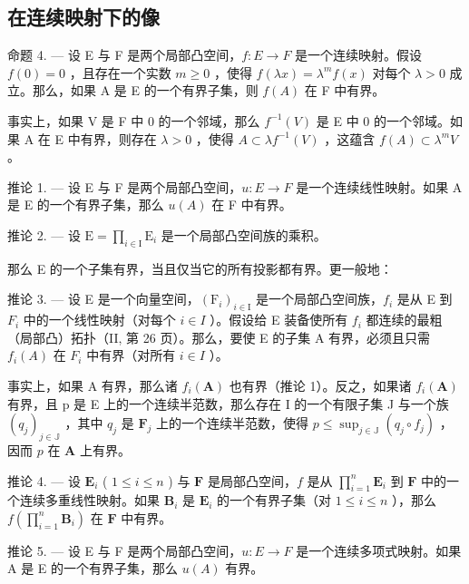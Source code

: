 \subsection{在连续映射下的像}

命题 4. --- 设 E 与 F 是两个局部凸空间，\(f:E \rightarrow F\) 是一个连续映射。假设 \(f(0) = 0\) ，且存在一个实数 \(m \geqslant 0\) ，使得 \(f(\lambda x) = \lambda^{m}f(x)\) 对每个 \(\lambda > 0\) 成立。那么，如果 A 是 E 的一个有界子集，则 \(f(A)\) 在 F 中有界。

事实上，如果 V 是 F 中 0 的一个邻域，那么 \(f^{-1}(V)\) 是 E 中 0 的一个邻域。如果 A 在 E 中有界，则存在 \(\lambda > 0\) ，使得 \(A \subset \lambda f^{-1}(V)\) ，这蕴含 \(f(A) \subset \lambda^{m}V\) 。

推论 1. --- 设 E 与 F 是两个局部凸空间，\(u:E\to F\) 是一个连续线性映射。如果 A 是 E 的一个有界子集，那么 \(u(A)\) 在 F 中有界。

推论 2. --- 设 \(\mathrm{E} = \prod_{i\in \mathrm{I}}\mathrm{E}_i\) 是一个局部凸空间族的乘积。

那么 E 的一个子集有界，当且仅当它的所有投影都有界。更一般地：

推论 3. --- 设 E 是一个向量空间，\((\mathrm{F}_{i})_{i\in\mathrm{I}}\) 是一个局部凸空间族，\(f_{i}\) 是从 E 到 \(F_{i}\) 中的一个线性映射（对每个 \(i\in I\) ）。假设给 E 装备使所有 \(f_{i}\) 都连续的最粗（局部凸）拓扑（II, 第 26 页）。那么，要使 E 的子集 A 有界，必须且只需 \(f_{i}(A)\) 在 \(F_{i}\) 中有界（对所有 \(i\in I\) ）。

事实上，如果 A 有界，那么诸 \(f_{i}(\mathbf{A})\) 也有界（推论 1）。反之，如果诸 \(f_{i}(\mathbf{A})\) 有界，且 p 是 E 上的一个连续半范数，那么存在 I 的一个有限子集 J 与一个族 \((q_{j})_{j\in \mathbb{J}}\) ，其中 \(q_{j}\) 是 \(\mathbf{F}_j\) 上的一个连续半范数，使得 \(p\leqslant \sup_{j\in \mathbb{J}}(q_j\circ f_j)\) ，因而 \(p\) 在 \(\mathbf{A}\) 上有界。

推论 4. --- 设 \(\mathbf{E}_i\) ( \(1 \leqslant i \leqslant n\) ) 与 \(\mathbf{F}\) 是局部凸空间，\(f\) 是从 \(\prod_{i=1}^{n} \mathbf{E}_i\) 到 \(\mathbf{F}\) 中的一个连续多重线性映射。如果 \(\mathbf{B}_i\) 是 \(\mathbf{E}_i\) 的一个有界子集（对 \(1 \leqslant i \leqslant n\) ），那么 \(f\left(\prod_{i=1}^{n} \mathbf{B}_i\right)\) 在 \(\mathbf{F}\) 中有界。

推论 5. --- 设 E 与 F 是两个局部凸空间，\(u:E\to F\) 是一个连续多项式映射。如果 A 是 E 的一个有界子集，那么 \(u(A)\) 有界。

